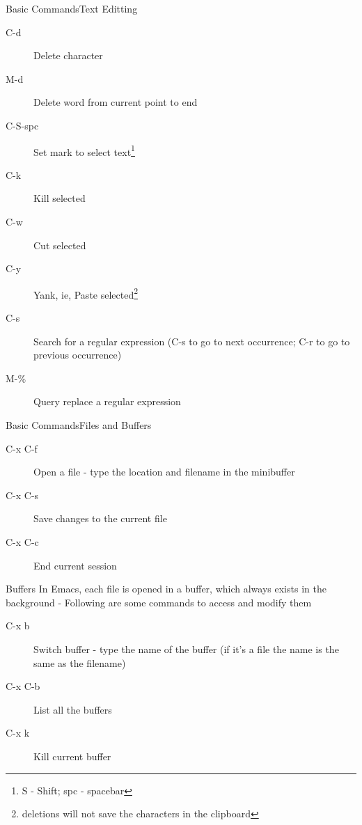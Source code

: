 \documentclass{beamer}
\begin{document}
\begin{frame}{Basic Commands}{Text Editting}
\begin{description}
\item[C-d] Delete character
\pause
\item[M-d] Delete word from current point to end
\pause
\item[C-S-spc] Set mark to select text\footnote{S - Shift; spc - spacebar}
\pause
\item[C-k] Kill selected 
\pause
\item[C-w] Cut selected
\pause
\item[C-y] Yank, ie, Paste selected\footnote{deletions will not save the characters in the clipboard}
\pause
\item[C-s] Search for a regular expression (C-s to go to next occurrence; C-r to go to previous occurrence)
\item[M-\%] Query replace a regular expression

\end{description}

\end{frame}

\begin{frame}{Basic Commands}{Files and Buffers}
\begin{description}
\item[C-x C-f] Open a file - type the location and filename in the minibuffer
\pause
\item[C-x C-s] Save changes to the current file
\pause
\item[C-x C-c] End current session
\end{description}
\pause
\begin{block}{Buffers}
In Emacs, each file is opened in a buffer, which always exists in the background - Following are some commands to access and modify them
\end{block}
\pause
\begin{description}
\item[C-x b] Switch buffer - type the name of the buffer (if it's a file the name is the same as the filename) 
\pause
\item[C-x C-b] List all the buffers
\pause
\item[C-x k] Kill current buffer
\end{description}
\end{frame}
\end{document}
